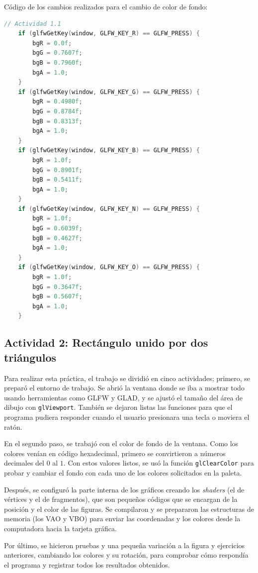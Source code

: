 Código de los cambios realizados para el cambio de color de fondo:\\

\begin{lstlisting}[language=C, caption=Código del ejercicio 1]
        // Actividad 1.1
    if (glfwGetKey(window, GLFW_KEY_R) == GLFW_PRESS) {
        bgR = 0.0f;
        bgG = 0.7607f;
        bgB = 0.7960f;
        bgA = 1.0;
    }
    if (glfwGetKey(window, GLFW_KEY_G) == GLFW_PRESS) {
        bgR = 0.4980f;
        bgG = 0.8784f;
        bgB = 0.8313f;
        bgA = 1.0;
    }
    if (glfwGetKey(window, GLFW_KEY_B) == GLFW_PRESS) {
        bgR = 1.0f;
        bgG = 0.8901f;
        bgB = 0.5411f;
        bgA = 1.0;
    }
    if (glfwGetKey(window, GLFW_KEY_N) == GLFW_PRESS) {
        bgR = 1.0f;
        bgG = 0.6039f;
        bgB = 0.4627f;
        bgA = 1.0;
    }
    if (glfwGetKey(window, GLFW_KEY_O) == GLFW_PRESS) {
        bgR = 1.0f;
        bgG = 0.3647f;
        bgB = 0.5607f;
        bgA = 1.0;
    }
\end{lstlisting}

\subsection{Actividad 2: Rectángulo unido por dos triángulos}

Para realizar esta práctica, el trabajo se dividió en cinco actividades; primero, se preparó el entorno de trabajo. Se abrió la ventana donde se iba a mostrar todo usando herramientas como GLFW y GLAD, y se ajustó el tamaño del área de dibujo con \texttt{glViewport}. También se dejaron listas las funciones para que el programa pudiera responder cuando el usuario presionara una tecla o moviera el ratón.

En el segundo paso, se trabajó con el color de fondo de la ventana. Como los colores venían en código hexadecimal, primero se convirtieron a números decimales del $0$ al $1$. Con estos valores listos, se usó la función \texttt{glClearColor} para probar y cambiar el fondo con cada uno de los colores solicitados en la paleta.

Después, se configuró la parte interna de los gráficos creando los \textit{shaders} (el de vértices y el de fragmentos), que son pequeños códigos que se encargan de la posición y el color de las figuras. Se compilaron y se prepararon las estructuras de memoria (los VAO y VBO) para enviar las coordenadas y los colores desde la computadora hacia la tarjeta gráfica.

Por último, se hicieron pruebas y una pequeña variación a la figura y ejercicios anteriores, cambiando los colores y su rotación, para comprobar cómo respondía el programa y registrar todos los resultados obtenidos.


